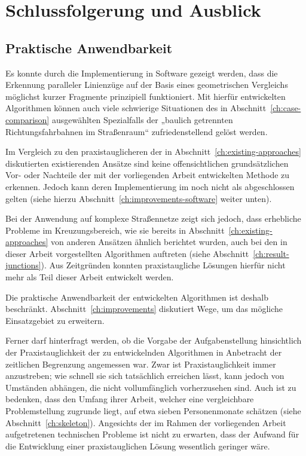 \documentclass[../main/thesis.tex]{subfiles}
\begin{document}
\chapter{Schlussfolgerung und Ausblick}

\section{Praktische Anwendbarkeit}

Es konnte durch die Implementierung in Software gezeigt werden, dass die Erkennung paralleler Linienzüge auf der Basis eines geometrischen Vergleichs möglichst kurzer Fragmente prinzipiell funktioniert.
Mit hierfür entwickelten Algorithmen können auch viele schwierige Situationen des in Abschnitt~\ref{ch:case-comparison} ausgewählten Spezialfalls der „baulich getrennten Richtungsfahrbahnen im Straßenraum“ zufriedenstellend gelöst werden.

Im Vergleich zu den praxistauglicheren der in Abschnitt~\ref{ch:existing-approaches} diskutierten existierenden Ansätze sind keine offensichtlichen grundsätzlichen Vor- oder Nachteile der mit der vorliegenden Arbeit entwickelten Methode zu erkennen.
Jedoch kann deren Implementierung im  noch nicht als abgeschlossen gelten (siehe hierzu Abschnitt~\ref{ch:improvements-software} weiter unten).

Bei der Anwendung auf komplexe Straßennetze zeigt sich jedoch, dass erhebliche Probleme im Kreuzungsbereich, wie sie bereits in Abschnitt~\ref{ch:existing-approaches} von anderen Ansätzen ähnlich berichtet wurden, auch bei den in dieser Arbeit vorgestellten Algorithmen auftreten (siehe Abschnitt~\ref{ch:result-junctions}).
Aus Zeitgründen konnten praxistaugliche Lösungen hierfür nicht mehr als Teil dieser Arbeit entwickelt werden.

Die praktische Anwendbarkeit der entwickelten Algorithmen ist deshalb beschränkt.
Abschnitt~\ref{ch:improvements} diskutiert Wege, um das mögliche Einsatzgebiet zu erweitern.

Ferner darf hinterfragt werden, ob die Vorgabe der Aufgabenstellung hinsichtlich der Praxistauglichkeit der zu entwickelnden Algorithmen in Anbetracht der zeitlichen Begrenzung angemessen war.
Zwar ist Praxistauglichkeit immer anzustreben; wie schnell sie sich tatsächlich erreichen lässt, kann jedoch von Umständen abhängen, die nicht vollumfänglich vorherzusehen sind.
Auch ist zu bedenken, dass \citeauthor{LM96} den Umfang ihrer Arbeit, welcher eine vergleichbare Problemstellung zugrunde liegt, auf etwa sieben Personenmonate schätzen (siehe Abschnitt~\ref{ch:skeleton}). 
Angesichts der im Rahmen der vorliegenden Arbeit aufgetretenen technischen Probleme ist nicht zu erwarten, dass der Aufwand für die Entwicklung einer praxistauglichen Lösung wesentlich geringer wäre.
\end{document}
